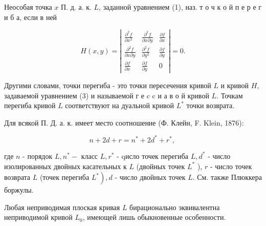 \documentclass[10pt]{article}
\begin{document}
Неособая точка $x$ П. д. а. к. $L$, заданной уравнением (1), наз. т о ч к о й п е р е г и б а, если в ней



\[

H(x, y)=\left|\begin{array}{lll}

\frac{\partial^{2} f}{\partial x^{2}} & \frac{\partial^{2} f}{\partial x \partial y} & \frac{\partial f}{\partial x} \\

\frac{\partial^{2} f}{\partial x \partial y} & \frac{\partial^{2} f}{\partial y^{2}} & \frac{\partial f}{\partial y} \\

\frac{\partial f}{\partial x} & \frac{\partial f}{\partial y} & 0

\end{array}\right|=0 .

\]



Другими словами, точки перегиба - это точки пересечения кривой $L$ и кривой $H$, задаваемой уравнением (3) и называемой г е c c и а в о й кривой $L$. Точкам перегиба кривой $L$ соответствуют на дуальной кривой $L^{*}$ точки возврата.



Для всякой П. Д. а. к. имеет место соотношение (Ф. Клейн, F. Klein, 1876):



\[

n+2 d+r=n^{*}+2 d^{*}+r^{*} \text {, }

\]



где $n$ - порядок $L, n^{*}-$ класс $L, r^{*}$ - qисло точек перегиба $L, d^{*}$ - число изолированных двойных касательных к $L$ (двойных точек $L^{*}$ ), $r$ - число точек возврата $L$ (точек перегиба $\left.L^{*}\right), d$ - число двойных точек $L$. См. также Плюккера боржулы.



Любая неприводимая плоская кривая $L$ бирационально эквивалентна неприводимой кривой $L_{0}$, имеющей лишь обыкновенные особенности.
\end{document}
